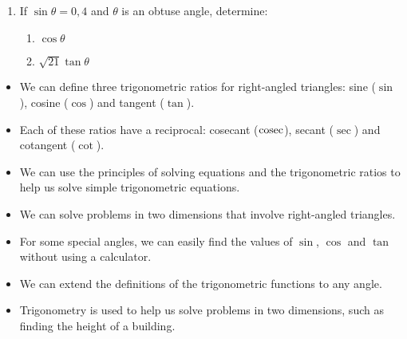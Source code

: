 \begin{exercises}{}
{\begin{enumerate}[itemsep=5pt, label=\textbf{\arabic*}. ]
\item If $\sin \theta= 0,4$ and $\theta$ is an obtuse angle, determine:
\begin{enumerate}[noitemsep, label=\textbf{(\alph*)} ]
 \item $\cos \theta$
\item $\sqrt{21} \tan \theta$
\end{enumerate}
\end{enumerate}
}
\end{exercises}

\begin{itemize}[noitemsep]
\item We can define three trigonometric ratios for right-angled triangles: sine ($\sin$), cosine ($\cos$) and tangent ($\tan$).
\item Each of these ratios have a reciprocal: cosecant ($\operatorname{cosec}$), secant ($\sec$) and cotangent ($\cot$).
\item We can use the principles of solving equations and the trigonometric ratios to help us solve simple trigonometric equations.
\item We can solve problems in two dimensions that involve right-angled triangles.
\item For some special angles, we can easily find the values of $\sin$, $\cos$ and $\tan$ without using a calculator.
\item We can extend the definitions of the trigonometric functions to any angle.
\item Trigonometry is used to help us solve problems in two dimensions, such as finding the height of a building.
\end{itemize}


